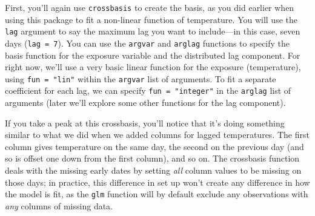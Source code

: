 \documentclass[
]{book}
\newenvironment{Shaded}{\begin{snugshade}}{\end{snugshade}}
\newcommand{\DataTypeTok}[1]{\textcolor[rgb]{0.13,0.29,0.53}{#1}}
\newcommand{\DecValTok}[1]{\textcolor[rgb]{0.00,0.00,0.81}{#1}}
\newcommand{\KeywordTok}[1]{\textcolor[rgb]{0.13,0.29,0.53}{\textbf{#1}}}
\newcommand{\NormalTok}[1]{#1}
\newcommand{\OperatorTok}[1]{\textcolor[rgb]{0.81,0.36,0.00}{\textbf{#1}}}
\newcommand{\StringTok}[1]{\textcolor[rgb]{0.31,0.60,0.02}{#1}}
\begin{document}
First, you'll again use \texttt{crossbasis} to create the basis, as you did earlier when using this
package to fit a non-linear function of temperature. You will use the \texttt{lag} argument to say
the maximum lag you want to include---in this case, seven days (\texttt{lag\ =\ 7}). You can use
the \texttt{argvar} and \texttt{arglag} functions to specify the basis function for the exposure variable
and the distributed lag component. For right now, we'll use a very basic linear function for
the exposure (temperature), using \texttt{fun\ =\ "lin"} within the \texttt{argvar} list of arguments.
To fit a separate coefficient for each lag, we can specify \texttt{fun\ =\ "integer"} in the
\texttt{arglag} list of arguments (later we'll explore some other functions for the lag component).

\begin{Shaded}
\end{Shaded}

If you take a peak at this crossbasis, you'll notice that it's doing something similar to
what we did when we added columns for lagged temperatures. The first column gives temperature
on the same day, the second on the previous day (and so is offset one down from the first
column), and so on. The crossbasis function deals with the missing early dates by setting
\emph{all} column values to be missing on those days; in practice, this difference in set up
won't create any difference in how the model is fit, as the \texttt{glm} function will by default
exclude any observations with \emph{any} columns of missing data.

\begin{Shaded}
\end{Shaded}
\end{document}
